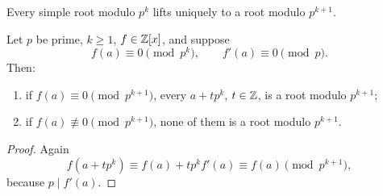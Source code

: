 \begin{remark}
Every simple root modulo $p^k$ lifts uniquely to a root modulo $p^{k+1}$.
\end{remark}

\begin{thm}
Let $p$ be prime, $k\ge1$, $f\in\mathbb{Z}[x]$, and suppose
\[
 f(a)\equiv0\pmod{p^k},\qquad f'(a)\equiv0\pmod p.
\]
Then:
\begin{enumerate}[label=(\roman*)]
\item if $f(a)\equiv0\pmod{p^{k+1}}$, every $a+tp^k$, $t\in\mathbb{Z}$, is a root modulo $p^{k+1}$;
\item if $f(a)\not\equiv0\pmod{p^{k+1}}$, none of them is a root modulo $p^{k+1}$.
\end{enumerate}
\end{thm}
\begin{proof}
Again
\[
 f(a+tp^k)\equiv f(a)+tp^k f'(a)\equiv f(a)\pmod{p^{k+1}},
\]
because $p\mid f'(a)$.
\end{proof}
